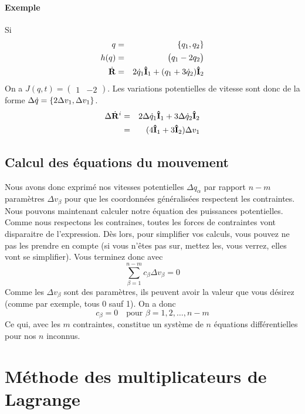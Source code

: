 \paragraph{Exemple}
Si
\begin{eqnarray*}
  q &=& \{q_1, q_2\}\\
h(q) &=& \begin{pmatrix}q_1 - 2q_2\end{pmatrix}\\
  \dot{\bf R} &=& 2\dot{q}_1 {\bf\hat{I}}_1 + (q_1 + 3\dot{q}_2) {\bf\hat{I}}_2
\end{eqnarray*}
On a $J(q, t) = \begin{pmatrix}1 & -2\end{pmatrix}$.
Les variations potentielles de vitesse sont donc de la forme $\Delta \dot{q} = \{2\Delta v_1, \Delta v_1\}$.
\begin{eqnarray*}
  \Delta \dot{\bf R}^i &=& 2 \Delta \dot{q}_1 {\bf\hat{I}}_1 + 3 \Delta \dot{q}_2 {\bf\hat{I}}_2\\
                &=& (4{\bf\hat{I}}_1 + 3{\bf\hat{I}}_2) \Delta v_1
\end{eqnarray*}


\subsection{Calcul des équations du mouvement}
Nous avons donc exprimé nos vitesses potentielles $\Delta q_\alpha$ par rapport $n - m$ paramètres $\Delta v_\beta$ pour que les coordonnées généralisées respectent les contraintes.
Nous pouvons maintenant calculer notre équation des puissances potentielles.
Comme nous respectons les contraines, toutes les forces de contraintes vont disparaitre de l'expression.
Dès lors, pour simplifier vos calculs, vous pouvez ne pas les prendre en compte (si vous n'êtes pas sur, mettez les, vous verrez, elles vont se simplifier).
Vous terminez donc avec
\[ \sum_{\beta = 1}^{n - m} c_\beta \Delta v_\beta = 0 \]
Comme les $\Delta v_\beta$ sont des paramètres, ils peuvent avoir la valeur que vous désirez
(comme par exemple, tous 0 sauf 1).
On a donc
\[ c_\beta = 0 \quad \text{pour }\beta = 1, 2, \ldots, n-m \]
Ce qui, avec les $m$ contraintes, constitue un système de $n$ équations différentielles pour nos $n$ inconnus.

\section{Méthode des multiplicateurs de Lagrange}

